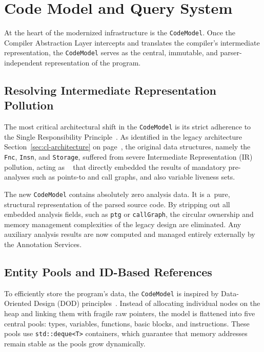 \documentclass[xpsejal00-gcc-plugin.tex]{subfiles}
\begin{document}
\section{Code Model and Query System}\label{sec:core}

At the heart of the modernized infrastructure is the \texttt{CodeModel}.
Once the Compiler Abstraction Layer intercepts and translates the compiler's intermediate representation, the \texttt{CodeModel} serves as the central, immutable, and parser-independent representation of the program.

\subsection*{Resolving Intermediate Representation Pollution}\label{sub:resolve-ir-pollution}

The most critical architectural shift in the \texttt{CodeModel} is its strict adherence to the Single Responsibility Principle~\cite{CleanArchitecture}.
As identified in the legacy architecture Section~\ref{sec:cl-architecture} on page~\pageref{sec:cl-architecture}, the original data structures, namely the \texttt{Fnc}, \texttt{Insn}, and \texttt{Storage}, suffered from severe Intermediate Representation (IR) pollution, acting as ~\cite{Refactoring} that directly embedded the results of mandatory pre-analyses such as points-to and call graphs, and also variable liveness sets.

The new \texttt{CodeModel} contains absolutely zero analysis data.
It is a~pure, structural representation of the parsed source code.
By stripping out all embedded analysis fields, such as \texttt{ptg} or \texttt{callGraph}, the circular ownership and memory management complexities of the legacy design are eliminated.
Any auxiliary analysis results are now computed and managed entirely externally by the Annotation Services.

\subsection*{Entity Pools and ID-Based References}\label{sub:entity-pools}

To efficiently store the program's data, the \texttt{CodeModel} is inspired by Data-Oriented Design (DOD) principles~\cite{DoD}.
Instead of allocating individual nodes on the heap and linking them with fragile raw pointers, the model is flattened into five central pools: types, variables, functions, basic blocks, and instructions.
These pools use \texttt{std::deque<T>} containers, which guarantee that memory addresses remain stable as the pools grow dynamically.
\end{document}
